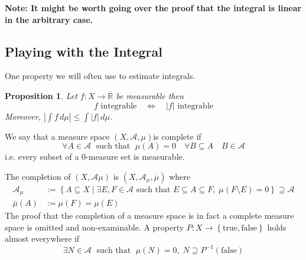 \documentclass[11pt]{article}
\newcommand{\defeq}{:=}
\newcommand{\abs}[1]{|#1|}
\newcommand{\msrspc}{\ensuremath{(X,\mathcal{A},\mu)}}
\newcommand{\relmiddle}[1]{\mathrel{}\middle#1\mathrel{}}
\newcommand{\rmv}{\relmiddle|}
\newcommand{\dm}{\ensuremath{\,d\mu}}
\newcommand{\R}{\mathbb{R}}
\newcommand{\Rb}{\overline{\R}}
\newenvironment{defin}
	{\begin{mdframed}[backgroundcolor=white, roundcorner=5pt, linewidth=1pt]}
	{\end{mdframed}}
\newcommand{\mdf}[1]{{\color{red} #1}}
\newenvironment{note}
	{\begin{mdframed}[backgroundcolor=white, linecolor=red, roundcorner=5pt, linewidth=1pt]\bfseries{Note:}\normalfont}
	{\end{mdframed}}
\newtheorem{prop}[theorem]{Proposition}
\begin{document}
\begin{note}
It might be worth going over the proof that the integral is linear in the arbitrary case.
\end{note}

\subsection{Playing with the Integral}
One property we will often use to estimate integrals.
\begin{prop}
Let $f:X\to\Rb$ be measurable then
\[
	f\text{ integrable}\quad\iff\quad\abs{f}\text{ integrable}
\]
Moreover, $\abs{\int f \dm} \leq \int \abs{f} \dm$.
\end{prop}
\begin{defin}
	We say that a measure space \msrspc is \mdf{complete} if 
\[
	\forall A \in \mathcal{A}\;\text{ such that }\;\mu(A) = 0\quad \forall B\subseteq A\quad B\in\mathcal{A}
\]
i.e. every subset of a $0$-measure set is measurable.

The \mdf{completion} of $(X, \mathcal{A}\mu)$ is $(X, \mathcal{A}_\mu , \overline{\mu})$ where
\begin{align*}
	\mathcal{A}_\mu & \defeq \left\{A \subseteq X \rmv \exists E,F\in\mathcal{A}\text{ such that }E\subseteq A \subseteq F,\;\mu(F\setminus E)=0\right\}\supseteq \mathcal{A}\\
	\overline{\mu}(A) & \defeq \mu(F) = \mu(E)
\end{align*}
The proof that the completion of a measure space is in fact a complete measure space is omitted and non-examinable.
	A property $P:X\to\left\{\text{true}, \text{false}\right\}$ holds \mdf{almost everywhere} if 
	\[
		\exists N\in \mathcal{A}\;\text{ such that }\;\mu(N)=0,\;N\supseteq P^{-1}(\text{false})
	\]
\end{defin}
\end{document}
